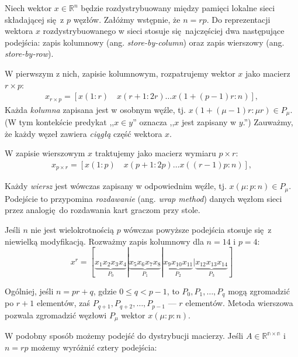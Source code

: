 Niech wektor \(x\in\mathbb{R}^n\) będzie rozdystrybuowany między pamięci lokalne sieci składającej się z \(p\) węzłów. Załóżmy wstępnie, że \(n=rp\). Do reprezentacji wektora \(x\) rozdystrybuowanego w sieci stosuje się najczęściej dwa następujące podejścia: zapis kolumnowy (ang. \emph{store-by-column}) oraz zapis wierszowy (ang. \emph{store-by-row}).

\noindent W pierwszym z nich, zapisie kolumnowym, rozpatrujemy wektor \(x\) jako macierz \(r\times p\):
\begin{align*}
x_{r\times p} = \left[x(1:r)\quad x(r+1:2r) \dots x(1+(p-1)r:n)\right],
\end{align*}
\noindent Każda \emph{kolumna} zapisana jest w osobnym węźle, tj. \( x (1+(\mu-1)r\colon \mu r) \in P_{\mu}\). (W tym kontekście predykat ,,\(x\in y\)'' oznacza ,,\(x\) jest zapisany w \(y\).'') Zauważmy, że każdy węzeł zawiera \emph{ciągłą} część wektora \(x\).


W zapisie wierszowym \(x\) traktujemy jako macierz wymiaru \(p\times r\):
\begin{align*}
x_{p\times r} = \left[x(1:p)\quad x(p+1:2p) \dots x((r-1)p:n)\right],
\end{align*}

Każdy \emph{wiersz} jest wówczas zapisany w odpowiednim węźle, tj. \(x (\mu \colon p \colon n)\in P_{\mu}\). Podejście to przypomina \emph{rozdawanie} (ang. \emph{wrap method}) danych węzłom sieci przez analogię do rozdawania kart graczom przy stole.

Jeśli \(n\) nie jest wielokrotnością \(p\) wówczas powyższe podejścia stosuje się z niewielką modyfikacją. Rozważmy zapis kolumnowy dla \(n=14\) i \(p=4\):
\begin{equation}
x^r=[\underbrace{x_1 x_2 x_3 x_4}_{P_0} | \underbrace{x_5 x_6 x_7 x_8}_{P_1} | \underbrace{x_9 x_{10} x_{11}}_{P_2} | \underbrace{x_{12} x_{13} x_{14}}_{P_3}]
\end{equation} 

Ogólniej, jeśli \(n = pr + q\), gdzie \(0\leq q < p-1\), to \(P_0, P_1, \dots, P_q\) mogą zgromadzić po \(r+1\) elementów, zaś \(P_{q+1}, P_{q+2}, \dots, P_{p-1}\) --- \(r\) elementów. Metoda wierszowa pozwala zgromadzić węzłowi \(P_{\mu}\) wektor \(x(\mu\colon p \colon n)\).

W podobny sposób możemy podejść do dystrybucji macierzy. Jeśli \(A\in\mathbb{R^{n\times n}}\) i \(n = rp\) możemy wyróżnić cztery podejścia:

